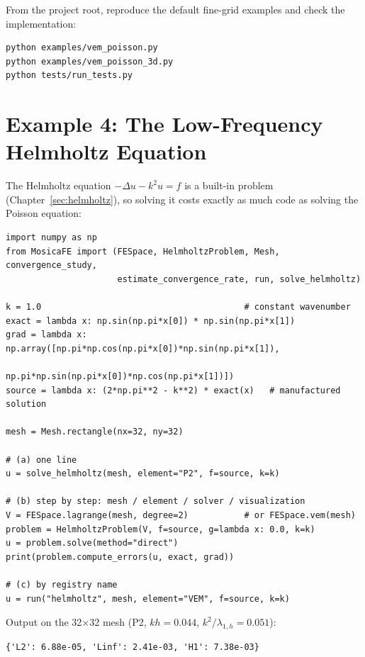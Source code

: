 \documentclass[11pt,oneside]{book}
\theoremstyle{definition}
\theoremstyle{plain}
\begin{document}
\clearpage
From the project root, reproduce the default fine-grid examples and check the implementation:

\begin{lstlisting}[style=shell]
python examples/vem_poisson.py
python examples/vem_poisson_3d.py
python tests/run_tests.py
\end{lstlisting}

\section{Example 4: The Low-Frequency Helmholtz Equation}

The Helmholtz equation $-\Delta u-k^2u=f$ is a built-in problem
(Chapter~\ref{sec:helmholtz}), so solving it costs exactly as much code as solving
the Poisson equation:

\begin{lstlisting}[language=MosicaFE,caption={Constant wavenumber, three equivalent spellings},label={lst:helmholtz-example}]
import numpy as np
from MosicaFE import (FESpace, HelmholtzProblem, Mesh, convergence_study,
                      estimate_convergence_rate, run, solve_helmholtz)

k = 1.0                                        # constant wavenumber
exact = lambda x: np.sin(np.pi*x[0]) * np.sin(np.pi*x[1])
grad = lambda x: np.array([np.pi*np.cos(np.pi*x[0])*np.sin(np.pi*x[1]),
                           np.pi*np.sin(np.pi*x[0])*np.cos(np.pi*x[1])])
source = lambda x: (2*np.pi**2 - k**2) * exact(x)   # manufactured solution

mesh = Mesh.rectangle(nx=32, ny=32)

# (a) one line
u = solve_helmholtz(mesh, element="P2", f=source, k=k)

# (b) step by step: mesh / element / solver / visualization
V = FESpace.lagrange(mesh, degree=2)           # or FESpace.vem(mesh)
problem = HelmholtzProblem(V, f=source, g=lambda x: 0.0, k=k)
u = problem.solve(method="direct")
print(problem.compute_errors(u, exact, grad))

# (c) by registry name
u = run("helmholtz", mesh, element="VEM", f=source, k=k)
\end{lstlisting}

Output on the 32$\times$32 mesh (P2, $kh=0.044$, $k^2/\lambda_{1,h}=0.051$):

\begin{lstlisting}[style=textout]
{'L2': 6.88e-05, 'Linf': 2.41e-03, 'H1': 7.38e-03}
\end{lstlisting}
\end{document}
